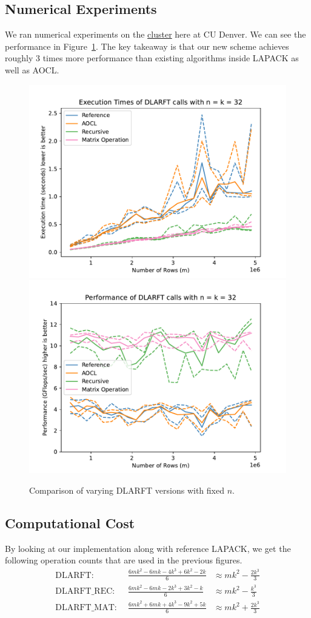 \documentclass[12pt]{article}
\begin{document}
    \subsection{Numerical Experiments}
    We ran numerical experiments on the \href{https://ccm-docs.readthedocs.io/en/latest/alderaan/#hardware}{cluster}
    here at CU Denver. We can see the performance in Figure~\ref{fig:DLARFT}. The key takeaway is that our new
    scheme achieves roughly 3 times more performance than existing algorithms inside LAPACK as well as AOCL.
    \begin{figure}
        \centering
        \includegraphics[width=.45\textwidth]{figures/timeDLARFT.pdf}
        \includegraphics[width=.45\textwidth]{figures/flopDLARFT.pdf}
        \caption{Comparison of varying DLARFT versions with fixed $n$.}\label{fig:DLARFT}
    \end{figure}
    \subsection{Computational Cost}
    By looking at our implementation along with reference LAPACK, we get the following operation counts that are
    used in the previous figures.
    \[
    \begin{aligned}
            \text{DLARFT: }&\,      \frac{6mk^2 - 6mk -4k^3 +6k^2 - 2k}{6}&\approx mk^2 - \frac{2k^3}{3}\\
            \text{DLARFT\_REC: }&\, \frac{6mk^2 - 6mk -2k^3 +3k^2 -  k}{6}&\approx mk^2 - \frac{k^3}{3}\\
            \text{DLARFT\_MAT: }&\, \frac{6mk^2 + 6mk +4k^3 -9k^2 + 5k}{6}&\approx mk^2 + \frac{2k^3}{3}
    \end{aligned}
    \]
\end{document}
